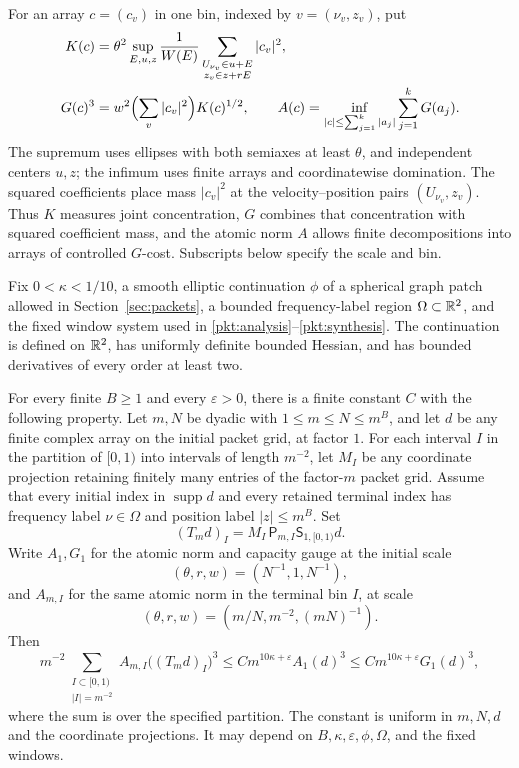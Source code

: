For an array \(c=(c_v)\) in one bin, indexed by
\(v=(\nu_v,z_v)\), put
\begin{align*}
 K(c)&=\theta^2\sup_{E,u,z}\frac{1}{W(E)}
       \sum_{\substack{U_{\nu_v}\in u+E\\z_v\in z+rE}}|c_v|^2,\\
 G(c)^3&=w^2\Bigl(\sum_v|c_v|^2\Bigr)K(c)^{1/2},\qquad
 A(c)=\inf_{|c|\le\sum_{j=1}^k|a_j|}\sum_{j=1}^kG(a_j).
\end{align*}
The supremum uses ellipses with both semiaxes at least \(\theta\),
and independent centers \(u,z\); the infimum uses finite arrays and
coordinatewise domination. The squared coefficients place mass
\(|c_v|^2\) at the velocity--position pairs \((U_{\nu_v},z_v)\).
Thus \(K\) measures joint concentration,
\(G\) combines that concentration with squared coefficient mass, and
the atomic norm \(A\) allows finite decompositions into arrays of
controlled \(G\)-cost. Subscripts below specify the scale and bin.

\begin{theorem}\label{thm:intro-packets}
Fix \(0<\kappa<1/10\), a smooth elliptic continuation \(\phi\) of a
spherical graph patch allowed in Section~\ref{sec:packets}, a bounded
frequency-label region \(\Omega\subset\mathbb R^2\), and the fixed window system
used in \eqref{pkt:analysis}--\eqref{pkt:synthesis}.  The continuation is
defined on \(\mathbb R^2\), has uniformly definite bounded Hessian, and has
bounded derivatives of every order at least two.

For every finite \(B\ge1\) and every \(\varepsilon>0\), there is a finite
constant \(C\) with the following property.  Let \(m,N\) be dyadic with
\(1\le m\le N\le m^B\), and let \(d\) be any finite complex array on the
initial packet grid, at factor \(1\).  For each interval \(I\) in the
partition of \([0,1)\) into intervals of length \(m^{-2}\), let \(M_I\)
be any coordinate projection retaining finitely many entries of the
factor-\(m\) packet grid.  Assume that every initial index in
\(\operatorname{supp}d\) and every retained terminal index has frequency
label \(\nu\in\Omega\) and position label \(|z|\le m^B\).  Set
\[
 (T_md)_I=M_I\,\mathsf P_{m,I}\mathsf S_{1,[0,1)}d.
\]
Write \(A_1,G_1\) for the atomic norm and capacity gauge at the initial
scale
\[
 (\theta,r,w)=(N^{-1},1,N^{-1}),
\]
and \(A_{m,I}\) for the same atomic norm in the terminal bin \(I\), at
scale
\[
 (\theta,r,w)=(m/N,m^{-2},(mN)^{-1}).
\]
Then
\[
 m^{-2}\sum_{\substack{I\subset[0,1)\\ |I|=m^{-2}}}
       A_{m,I}\bigl((T_md)_I\bigr)^3
 \le C m^{10\kappa+\varepsilon}A_1(d)^3
 \le C m^{10\kappa+\varepsilon}G_1(d)^3,
\]
where the sum is over the specified partition.  The constant is uniform
in \(m,N,d\) and the coordinate projections.  It may depend on
\(B,\kappa,\varepsilon,\phi,\Omega\), and the fixed windows.
\end{theorem}

